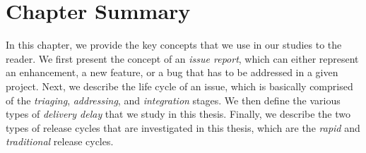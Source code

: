 \section{Chapter Summary}

In this chapter, we provide the key concepts that we use in our studies to the
reader. We first present the concept of an {\em issue report}, which can either
represent an enhancement, a new feature, or a bug that has to be addressed in a
given project. Next, we describe the life cycle of an issue, which is basically
comprised of the {\em triaging}, {\em addressing}, and {\em integration} stages.
We then define the various types of {\em delivery delay} that we study in this
thesis. Finally, we describe the two types of release cycles that are
investigated in this thesis, which are the {\em rapid} and {\em traditional}
release cycles.

